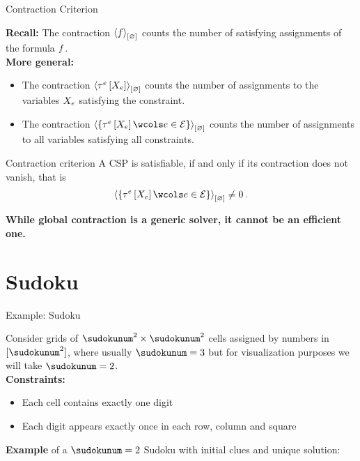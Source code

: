 \documentclass{beamer}
\begin{document}
    \begin{frame}{Contraction Criterion}

        {\bf Recall:} The contraction $\left\langle f\right\rangle_{\left[ \varnothing \right]}$ counts the number of satisfying assignments of the formula $f$. \\
    {\bf More general:}
        \begin{itemize}
            \item The contraction $\left\langle \tau^{e}\left[X_{e}\right]\right\rangle_{\left[ \varnothing \right]}$ counts the number of assignments to the variables $X_{e}$ satisfying the constraint.
            \item The contraction $\contraction{\{\hypercoreofat{\edge}{\catvariableof{\edge}}\wcols \edgein\}}$ counts the number of assignments to all variables satisfying all constraints.
        \end{itemize}


        \begin{block}{Contraction criterion}
            A CSP is satisfiable, if and only if its contraction does not vanish, that is
            \begin{align*}
                \contraction{\{\hypercoreofat{\edge}{\catvariableof{\edge}}\wcols \edgein\}} \neq 0 \, .
            \end{align*}
        \end{block}

        \begin{center}
            \bf While global contraction is a generic solver, it cannot be an efficient one.
        \end{center}

    \end{frame}

    \showoutlineatsection


    \section{Sudoku}

    \begin{frame}{Example: Sudoku}

        Consider grids of $\sudokunum^2 \times \sudokunum^2$ cells assigned by numbers in $[\sudokunum^2]$, where usually $\sudokunum=3$ but for visualization purposes we will take $\sudokunum=2$.
        \medskip \\
        {\bf Constraints:}
        \begin{itemize}
            \item Each cell contains exactly one digit
            \item Each digit appears exactly once in each row, column and square
        \end{itemize}
        \medskip
        {\bf Example} of a $\sudokunum=2$ Sudoku with initial clues and unique solution:
        
    \end{frame}
\end{document}
